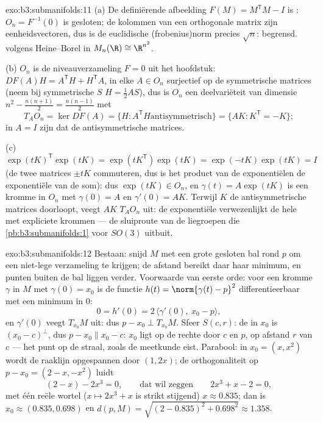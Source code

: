 \begin{solution}{exo:b3:submanifolds:11}
(a) De definiërende afbeelding $F(M) = M^{\mathsf T}M - I$ is
: $O_n = F^{-1}(0)$ is gesloten; de kolommen van een
orthogonale matrix zijn eenheidsvectoren, dus is de euclidische
(frobenius)norm precies $\sqrt n$: begrensd.  volgens
Heine--Borel in $M_n(\R) \cong \R^{n^2}$.

(b) $O_n$ is de niveauverzameling $F = 0$ uit het hoofdstuk:
$DF(A)H = A^{\mathsf T}H + H^{\mathsf T}A$, in elke $A \in O_n$
surjectief op de symmetrische matrices (neem bij symmetrische $S$
$H = \frac12AS$), dus is $O_n$ een deelvariëteit van dimensie
$n^2 - \frac{n(n+1)}2 = \frac{n(n-1)}2$ met
\[
T_AO_n = \ker DF(A) = \{H : A^{\mathsf T}H \text{
antisymmetrisch}\} = \{AK : K^{\mathsf T} = -K\} ;
\]
in $A = I$ zijn dat de antisymmetrische matrices.

(c) $\exp(tK)^{\mathsf T}\exp(tK) = \exp(tK^{\mathsf T})
\exp(tK) = \exp(-tK)\exp(tK) = I$ (de twee matrices $\pm tK$
commuteren, dus is het product van de exponentiëlen de
exponentiële van de som): dus $\exp(tK) \in O_n$, en $\gamma(t) =
A\exp(tK)$ is een kromme in $O_n$ met $\gamma(0) = A$ en
$\gamma'(0) = AK$. Terwijl $K$ de antisymmetrische matrices
doorloopt, veegt $AK$ $T_AO_n$ uit: de exponentiële verwezenlijkt
de hele  met expliciete krommen --- de sluiproute van
de liegroepen die \cref{pb:b3:submanifolds:1} voor $SO(3)$
uitbuit.
\end{solution}

\begin{solution}{exo:b3:submanifolds:12}
Bestaan: snijd $M$ met een grote gesloten bal rond $p$ om een
niet-lege  verzameling te krijgen; de  afstand
bereikt daar haar minimum, en punten buiten de bal liggen verder.
Voorwaarde van eerste orde: voor een kromme $\gamma$ in $M$ met
$\gamma(0) = x_0$ is de functie $h(t) = \norm{\gamma(t) - p}^2$
differentieerbaar met een minimum in $0$:
\[
0 = h'(0) = 2\,\langle\gamma'(0),\ x_0 - p\rangle,
\]
en $\gamma'(0)$ veegt $T_{x_0}M$ uit: dus $p - x_0 \perp
T_{x_0}M$. Sfeer $S(c, r)$: de  in $x_0$ is $(x_0 -
c)^\perp$, dus $p - x_0 \parallel x_0 - c$: $x_0$ ligt op de
rechte door $c$ en $p$, op afstand $r$ van $c$ --- het punt op de
straal, zoals de meetkunde eist. Parabool: in $x_0 = (x, x^2)$
wordt de raaklijn opgespannen door $(1, 2x)$; de orthogonaliteit
op $p - x_0 = (2 - x, -x^2)$ luidt
\[
(2 - x) - 2x^3 = 0,
\qquad\text{dat wil zeggen}\qquad 2x^3 + x - 2 = 0,
\]
met één reële wortel ($x \mapsto 2x^3 + x$ is strikt stijgend)
$x \approx 0.835$; dan is $x_0 \approx (0.835, 0.698)$ en $d(p,
M) = \sqrt{(2 - 0.835)^2 + 0.698^2} \approx 1.358$.
\end{solution}

